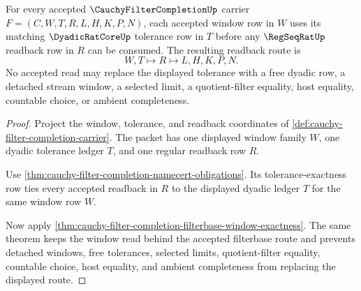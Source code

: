 \begin{theorem}
\label{thm:cauchy-filter-completion-window-tolerance-exactness}
For every accepted $\CauchyFilterCompletionUp$ carrier $F=(C,W,T,R,L,H,K,P,N)$, each accepted window row in $W$ uses its matching $\DyadicRatCoreUp$ tolerance row in $T$ before any $\RegSeqRatUp$ readback row in $R$ can be consumed. The resulting readback route is
$$
W,T \longmapsto R \longmapsto L,H,K,P,N .
$$
No accepted read may replace the displayed tolerance with a free dyadic row, a detached stream window, a selected limit, a quotient-filter equality, host equality, countable choice, or ambient completeness.
\end{theorem}
\begin{proof}
Project the window, tolerance, and readback coordinates of \autoref{def:cauchy-filter-completion-carrier}. The packet has one displayed window family $W$, one dyadic tolerance ledger $T$, and one regular readback row $R$.

Use \autoref{thm:cauchy-filter-completion-namecert-obligations}. Its tolerance-exactness row ties every accepted readback in $R$ to the displayed dyadic ledger $T$ for the same window row $W$.

Now apply \autoref{thm:cauchy-filter-completion-filterbase-window-exactness}. The same theorem keeps the window read behind the accepted filterbase route and prevents detached windows, free tolerances, selected limits, quotient-filter equality, countable choice, host equality, and ambient completeness from replacing the displayed route.
\end{proof}

